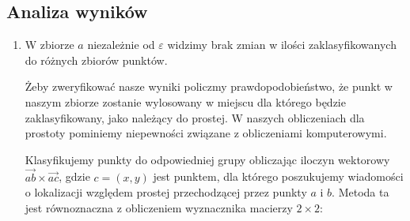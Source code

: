              \subsection{Analiza wyników}
\begin{enumerate}
    \item \quad W zbiorze $a$ niezależnie od $\varepsilon$ widzimy brak zmian 
w ilości zaklasyfikowanych do różnych zbiorów punktów. \par
\quad Żeby zweryfikować nasze wyniki policzmy prawdopodobieństwo, że punkt w naszym zbiorze zostanie 
wylosowany w miejscu dla którego będzie zaklasyfikowany, jako należący do prostej. 
W naszych obliczeniach dla prostoty pominiemy niepewności związane z obliczeniami komputerowymi.\par
\quad Klasyfikujemy punkty do odpowiedniej grupy obliczając iloczyn wektorowy
$\overrightarrow{ab} \times \overrightarrow{ac}$, gdzie $ c = (x,y)$ jest punktem, dla którego poszukujemy wiadomości o lokalizacji względem prostej przechodzącej przez punkty $ a$ i $ b$. Metoda ta jest równoznaczna z obliczeniem wyznacznika macierzy $ 2\times2$:  


\end{enumerate}
